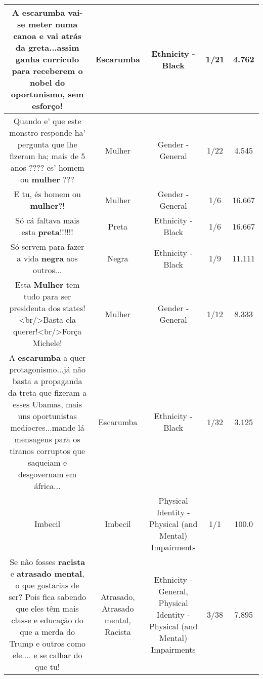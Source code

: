 \documentclass[11pt]{article}
\newlength\mylength
\begin{document}
\begin{center}
\begin{longtable}{|C{.65\mylength}|C{.30\mylength}|C{.12\mylength}|C{.12\mylength}|C{.12\mylength}|}
  \small A \textbf{escarumba} vai-se meter numa canoa e vai atrás da greta...assim ganha currículo para receberem o nobel do oportunismo, sem esforço!\normalsize   & Escarumba & Ethnicity - Black & 1/21 & 4.762 \\  \hline
  \small Quando e' que este monstro responde ha' pergunta que lhe fizeram ha; mais de 5 anos ???? es' homem ou \textbf{mulher} ???\normalsize   & Mulher & Gender - General & 1/22 & 4.545 \\  \hline
  \small E tu, és homem ou \textbf{mulher}?!\normalsize   & Mulher & Gender - General & 1/6 & 16.667 \\  \hline
  \small Só cá faltava mais esta \textbf{preta}!!!!!!\normalsize   & Preta & Ethnicity - Black & 1/6 & 16.667 \\  \hline
  \small Só servem para fazer a vida \textbf{negra} aos outros...\normalsize   & Negra & Ethnicity - Black & 1/9 & 11.111 \\  \hline
  \small Esta \textbf{Mulher} tem tudo para ser presidenta dos states!<br/>Basta ela querer!<br/>Força Michele!\normalsize   & Mulher & Gender - General & 1/12 & 8.333 \\  \hline
  \small A \textbf{escarumba} a quer protagonismo...já não basta a propaganda da treta que fizeram a esses Ubamas, mais uns oportunistas medíocres...mande lá mensagens para os tiranos corruptos que saqueiam e desgovernam em áfrica...\normalsize   & Escarumba & Ethnicity - Black & 1/32 & 3.125 \\  \hline
  \small Imbecil\normalsize   & Imbecil & Physical Identity - Physical (and Mental) Impairments & 1/1 & 100.0 \\  \hline
  \small Se não fosses \textbf{racista} e \textbf{a\textbf{trasado} mental}, o que gostarias de ser? Pois fica sabendo que eles têm mais classe e educação do que a merda do Trump e outros como ele.... e se calhar do que tu!\normalsize   & Atrasado, Atrasado mental, Racista & Ethnicity - General, Physical Identity - Physical (and Mental) Impairments & 3/38 & 7.895 \\  \hline

\end{longtable}
\end{center}
\end{document}

